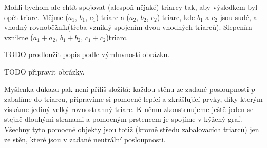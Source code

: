 Mohli bychom ale chtít spojovat (alespoň nějaké) triarcy tak, aby výsledkem byl opět triarc. Mějme ($a_1$, $b_1$, $c_1$)-triarc a ($a_2$, $b_2$, $c_2$)-triarc, kde $b_1$ a $c_2$ jsou sudé, a vhodný rovnoběžník(třeba vzniklý spojením dvou vhodných triarců). Slepením vznikne ($a_1+a_2$, $b_1+b_2$, $c_1+c_2$)triarc. 

TODO prodloužit popis podle výmluvnosti obrázku.

TODO připravit obrázky.

Myšlenka důkazu pak není příliš složitá: každou stěnu ze zadané posloupnosti $p$ zabalíme do triarcu, připravíme si pomocné lepící a zkrášlující prvky, díky kterým získáme jediný velký rovnostranný triarc. K němu zkonstruujeme ještě jeden se stejně dlouhými stranami a pomocným prstencem je spojíme v kýžený graf. Všechny tyto pomocné objekty jsou totiž (kromě středu zabalovacích triarců) jen ze stěn, které jsou v zadané neutrální posloupnosti.

